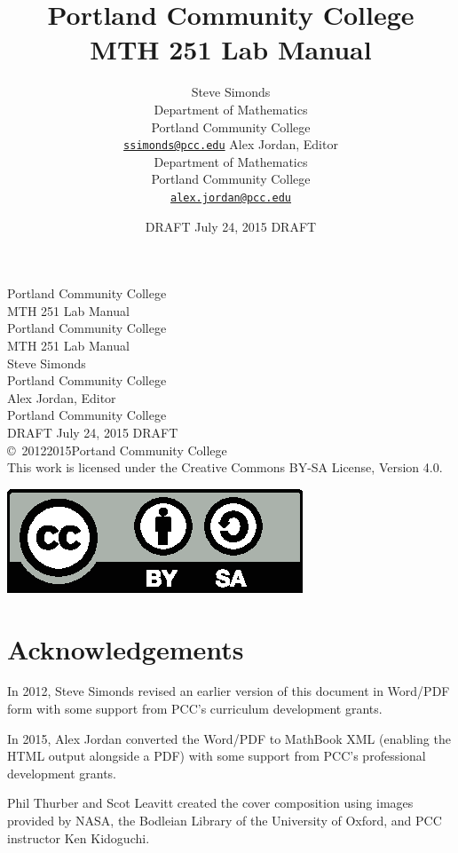 \documentclass[12pt,]{book}
\title{Portland Community College\\MTH 251 Lab Manual}
\author{Steve Simonds\\
Department of Mathematics\\
Portland Community College\\
\href{mailto:ssimonds@pcc.edu}{\nolinkurl{ssimonds@pcc.edu}}
Alex Jordan, Editor\\
Department of Mathematics\\
Portland Community College\\
\href{mailto:alex.jordan@pcc.edu}{\nolinkurl{alex.jordan@pcc.edu}}
}
\date{DRAFT July 24, 2015 DRAFT}
\theoremstyle{plain}
\theoremstyle{definition}
\numberwithin{equation}{section}
\begin{document}
\frontmatter
\thispagestyle{empty}
{\centering
\vspace*{0.28\textheight}
{\Huge Portland Community College\\MTH 251 Lab Manual}\\}
\clearpage
\thispagestyle{empty}
\null%
\clearpage
\thispagestyle{empty}
{\centering
\vspace*{0.14\textheight}
{\Huge Portland Community College\\MTH 251 Lab Manual}\\[3\baselineskip]
{\Large Steve Simonds}\\[0.5\baselineskip]
{\Large Portland Community College}\\[3\baselineskip]
{\Large Alex Jordan, Editor}\\[0.5\baselineskip]
{\Large Portland Community College}\\[3\baselineskip]
{\Large DRAFT July 24, 2015 DRAFT}\\}
\clearpage
\thispagestyle{empty}
\noindent\copyright\ 2012\textendash{}2015\quad{}Portand Community College\\[0.5\baselineskip]
This work is licensed under the Creative Commons BY-SA License, Version 4.0.%

            \par
\includegraphics[]{../images/by-sa.eps}%
\par
{}
\null\clearpage
\chapter*{Acknowledgements}\label{acknowledgement-1}
In 2012, Steve Simonds revised an earlier version of this document in Word/PDF form with some support from PCC's curriculum development grants.%
\par
In 2015, Alex Jordan converted the Word/PDF to MathBook XML (enabling the HTML output alongside a PDF) with some support from PCC's professional development grants.%
\par
Phil Thurber and Scot Leavitt created the cover composition using images provided by NASA, the Bodleian Library of the University of Oxford, and PCC instructor Ken Kidoguchi.%
\end{document}
